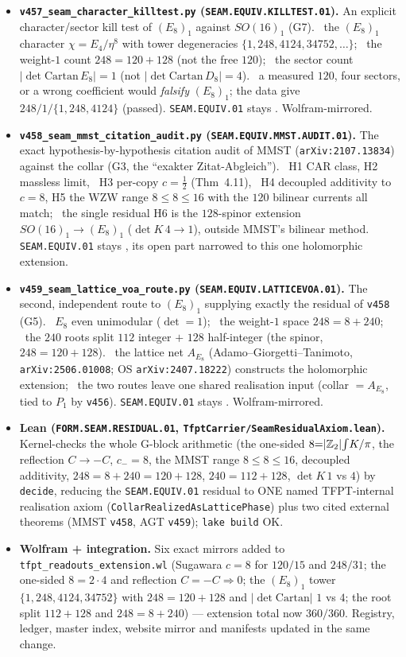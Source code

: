 \begin{itemize}
\item \textbf{\texttt{v457\_seam\_character\_killtest.py} (\texttt{SEAM.EQUIV.KILLTEST.01}).} An explicit
character/sector kill test of $(E_8)_1$ against $SO(16)_1$ (G7). \mE\ the $(E_8)_1$ character $\chi{=}E_4/\eta^8$
with tower degeneracies $\{1,248,4124,34752,\dots\}$; \mE\ the weight-$1$ count $248{=}120{+}128$ (not the free $120$); \mE\ the sector
count $|\!\det\mathrm{Cartan}\,E_8|{=}1$ (not $|\!\det\mathrm{Cartan}\,D_8|{=}4$). \mX\ a measured $120$, four sectors,
or a wrong coefficient would \emph{falsify} $(E_8)_1$; the data give $248/1/\{1,248,4124\}$ (passed).
\texttt{SEAM.EQUIV.01} stays \mO. Wolfram-mirrored.
\item \textbf{\texttt{v458\_seam\_mmst\_citation\_audit.py} (\texttt{SEAM.EQUIV.MMST.AUDIT.01}).} The exact
hypothesis-by-hypothesis citation audit of MMST (\texttt{arXiv:2107.13834}) against the collar (G3, the ``exakter
Zitat-Abgleich''). \mC\ H1 CAR class, H2 massless limit, \mE\ H3 per-copy $c{=}\tfrac12$ (Thm~4.11), \mC\ H4 decoupled
additivity to $c{=}8$, H5 the WZW range $8{\le}8{\le}16$ with the $120$ bilinear currents all match; \mO\ the single
residual H6 is the $128$-spinor extension $SO(16)_1{\to}(E_8)_1$ ($\det K\,4{\to}1$), outside MMST's bilinear method.
\texttt{SEAM.EQUIV.01} stays \mO, its open part narrowed to this one holomorphic extension.
\item \textbf{\texttt{v459\_seam\_lattice\_voa\_route.py} (\texttt{SEAM.EQUIV.LATTICEVOA.01}).} The second, independent
route to $(E_8)_1$ supplying exactly the residual of \texttt{v458} (G5). \mE\ $E_8$ even unimodular ($\det{=}1$); \mE\
the weight-$1$ space $248{=}8{+}240$; \mE\ the $240$ roots split $112$ integer $+$ $128$ half-integer (the spinor,
$248{=}120{+}128$). \mC\ the lattice net $A_{E_8}$ (Adamo--Giorgetti--Tanimoto, \texttt{arXiv:2506.01008}; OS
\texttt{arXiv:2407.18222}) constructs the holomorphic extension; \mO\ the two routes leave one shared realisation input
(collar $={}A_{E_8}$, tied to $P_1$ by \texttt{v456}). \texttt{SEAM.EQUIV.01} stays \mO. Wolfram-mirrored.
\item \textbf{Lean (\texttt{FORM.SEAM.RESIDUAL.01}, \texttt{TfptCarrier/SeamResidualAxiom.lean}).} Kernel-checks the
whole G-block arithmetic (the one-sided $8{=}|\mathbb{Z}_2|\!\int\!K/\pi$, the reflection $C{\to}{-}C$, $c_-{=}8$, the MMST
range $8{\le}8{\le}16$, decoupled additivity, $248{=}8{+}240{=}120{+}128$, $240{=}112{+}128$, $\det K\,1$ vs $4$) by
\texttt{decide}, reducing the \texttt{SEAM.EQUIV.01} residual to ONE named TFPT-internal realisation axiom
(\texttt{CollarRealizedAsLatticePhase}) plus two cited external theorems (MMST \texttt{v458}, AGT \texttt{v459});
\texttt{lake build} OK.
\item \textbf{Wolfram + integration.} Six exact mirrors added to \texttt{tfpt\_readouts\_extension.wl} (Sugawara
$c{=}8$ for $120/15$ and $248/31$; the one-sided $8{=}2\cdot4$ and reflection $C{=}{-}C\Rightarrow0$; the $(E_8)_1$
tower $\{1,248,4124,34752\}$ with $248{=}120{+}128$ and $|\!\det\mathrm{Cartan}|$ $1$ vs $4$; the root split
$112{+}128$ and $248{=}8{+}240$) --- extension total now $360/360$. Registry, ledger, master index, website mirror and
manifests updated in the same change.
\end{itemize}

